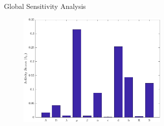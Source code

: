 \documentclass[handout,xcolor={x11names,table},compress,svgnames,mathserif]{beamer}
\renewcommand{\(}{\begin{columns}}
\renewcommand{\)}{\end{columns}}
\newcommand{\<}[1]{\begin{column}{#1}}
\renewcommand{\>}{\end{column}}
\begin{document}
\begin{frame}{Global Sensitivity Analysis}

\begin{figure}[htbp]
\begin{center}
\includegraphics[width=0.65\textwidth]{./Figures/as_tersoff_k200}
\end{center}
\end{figure}

\end{frame}
\end{document}

